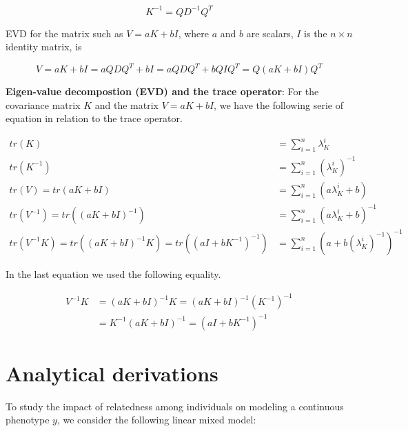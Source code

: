\documentclass[]{book}
\begin{document}
\begin{equation}
K^{-1} = Q D^{-1} Q^T
\label{eq:evdkinv}
\end{equation}

EVD for the matrix such as \(V = a K + b I\), where \(a\) and \(b\) are
scalars, \(I\) is the \(n \times n\) identity matrix, is

\begin{equation}
V = a K + b I = a Q D Q^T + b I = a Q D Q^T + b Q I Q^T = Q (a K + b I) Q^T
\label{eq:evdkinv}
\end{equation}

\textbf{Eigen-value decompostion (EVD) and the trace operator}: For the
covariance matrix \(K\) and the matrix \(V = a K + b I\), we have the
following serie of equation in relation to the trace operator.

\begin{equation}
\begin{split}
tr(K) & = \sum_{i=1}^{n}{\lambda_{K}^i} \\
tr(K^{-1}) & = \sum_{i=1}^{n}{(\lambda_{K}^i)^{-1}} \\
tr(V) = tr(a K + b I) & = \sum_{i=1}^{n}{(a \lambda_{K}^i + b)} \\
tr(V^{-1}) = tr((a K + b I)^{-1}) & = \sum_{i=1}^{n}{(a \lambda_{K}^i + b)^{-1}} \\
tr(V^{-1} K) = tr((a K + b I)^{-1} K) = tr((a I + b K^{-1})^{-1}) & = \sum_{i=1}^{n}{(a + b (\lambda_{K}^i)^{-1})^{-1}}
\end{split}
\label{eq:evdtr}
\end{equation}

In the last equation we used the following equality.

\begin{equation}
\begin{split}
V^{-1} K & = (a K + b I)^{-1} K = (a K + b I)^{-1} (K^{-1})^{-1} \\
 & = K^{-1} (a K + b I)^{-1} = (a I + b K^{-1})^{-1}
\end{split}
\label{eq:vinv}
\end{equation}

\section{Analytical derivations}\label{derivations}

To study the impact of relatedness among individuals on modeling a
continuous phenotype \(y\), we consider the following linear mixed
model:
\end{document}
